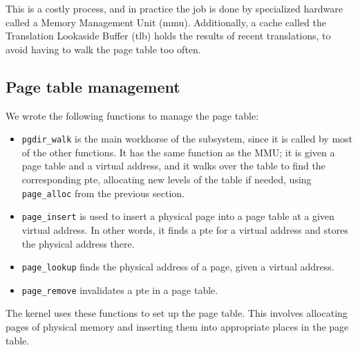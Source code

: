 \documentclass{article}
\begin{document}
This is a costly process, and in practice the job is done by specialized
hardware called a Memory Management Unit (\gls{mmu}). Additionally, a cache
called the Translation Lookaside Buffer (\gls{tlb}) holds the results of
recent translations, to avoid having to walk the page table too often.


\subsection{Page table management}
We wrote the following functions to manage the page table:
\begin{itemize}
\item \texttt{pgdir\_walk} is the main workhorse of the subsystem, since it is
called by most of the other functions. It has the same function as the MMU; it
is given a page table and a virtual address, and it walks over the table to
find the corresponding \gls{pte}, allocating new levels of the table if needed,
using \texttt{page\_alloc} from the previous section.
\item \texttt{page\_insert} is used to insert a physical page into a page
table at a given virtual address. In other words, it finds a \gls{pte} for a virtual
address and stores the physical address there.
\item \texttt{page\_lookup} finds the physical address of a page, given a
virtual address.
\item \texttt{page\_remove} invalidates a \gls{pte} in a page table.
\end{itemize}
The kernel uses these functions to set up the page table. This involves
allocating pages of physical memory and inserting them into appropriate places
in the page table. 
\end{document}
